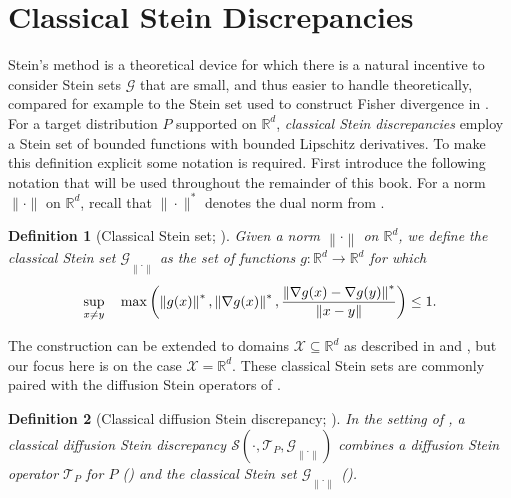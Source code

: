 \documentclass[12pt,paper=letter]{scrreprt}
\newtheorem{definition}{Definition}[chapter]
\def\R{\mathbb{R}}
\def\norm#1{\left\|{#1}\right\|} %
\newcommand{\dualnorm}[1]{\norm{#1}^*} %
\newcommand{\gset}[0]{\mathcal{G}} %
\newcommand{\steinset}[0]{\steinsetarg{}} %
\newcommand{\steinsetarg}[1]{\gset_{\norm{\cdot}_{#1}}} %
\begin{document}
\section{Classical Stein Discrepancies}
\label{sec: classical sd}

Stein's method is a theoretical device for which there is a natural incentive to consider Stein sets $\mathcal{G}$ that are small, and thus easier to handle theoretically, compared for example to the Stein set used to construct Fisher divergence in .
For a target distribution $P$ supported on $\R^d$,  
\emph{classical Stein discrepancies} \citep{gorham2015measuring,Gorham2019} 
employ a Stein set of bounded functions with bounded Lipschitz derivatives.
To make this definition explicit some notation is required.
First introduce the following notation that will be used throughout the remainder of this book.
For a norm $\|\cdot\|$ on $\mathbb{R}^d$, recall that $\|\cdot\|^*$ denotes the dual norm from .


\begin{definition}[Classical Stein set; \citealp{gorham2015measuring}]
\label{def:classical_set}
Given a norm $\norm{\cdot}$ on $\R^d$, we define the \emph{classical Stein set} $\steinset$ as the set of functions $g : \mathbb{R}^d \rightarrow \mathbb{R}^d$ for which 
\begin{align}\notag
\sup_{x \neq y} \quad \max \left( \dualnorm{g(x)} , \dualnorm{\nabla g(x)}, \frac{\dualnorm{\nabla g(x) - \nabla g(y)}}{\norm{x-y}} \right) \leq 1 .
\end{align}
\end{definition}


\noindent The construction can be extended to domains $\mathcal{X} \subseteq \mathbb{R}^d$ as described in  and \citet{gorham2015measuring}, but our focus here is on the case $\mathcal{X} = \mathbb{R}^d$.
These classical Stein sets are commonly paired with the diffusion Stein operators of .

\begin{definition}[Classical diffusion Stein discrepancy; \citealp{Gorham2019}]
\label{def:classical_diffusion_sd}
In the setting of , a \emph{classical diffusion Stein discrepancy} $\mathcal{S}(\cdot,\mathcal{T}_P,\steinset)$ combines a diffusion Stein operator $\mathcal{T}_P$ for $P$ () and the classical Stein set $\steinset$ ().
\end{definition}
\end{document}
